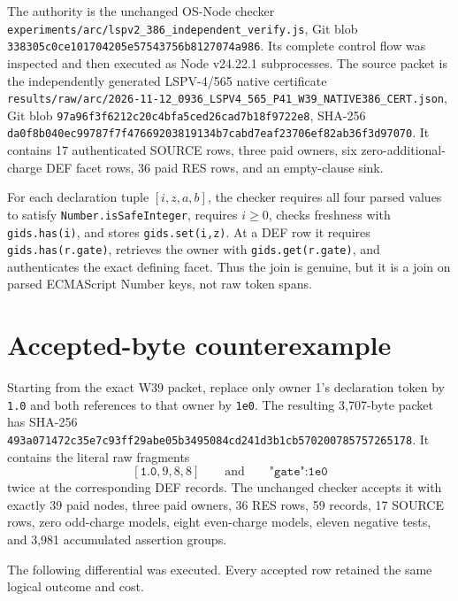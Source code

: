 \documentclass[11pt]{article}
\begin{document}
The authority is the unchanged OS-Node checker
\texttt{experiments/arc/lspv2\_386\_independent\_verify.js}, Git blob
\texttt{338305c0ce101704205e57543756b8127074a986}.  Its complete control flow was
inspected and then executed as Node v24.22.1 subprocesses.  The source packet is
the independently generated LSPV-4/565 native certificate
\texttt{results/raw/arc/2026-11-12\_0936\_LSPV4\_565\_P41\_W39\_NATIVE386\_CERT.json},
Git blob \texttt{97a96f3f6212c20c4bfa5ced26cad7b18f9722e8}, SHA-256
\texttt{da0f8b040ec99787f7f47669203819134b7cabd7eaf23706ef82ab36f3d97070}.
It contains 17 authenticated SOURCE rows, three paid owners, six zero-additional-
charge DEF facet rows, 36 paid RES rows, and an empty-clause sink.

For each declaration tuple $[i,z,a,b]$, the checker requires all four parsed
values to satisfy \texttt{Number.isSafeInteger}, requires $i\geq0$, checks
freshness with \texttt{gids.has(i)}, and stores \texttt{gids.set(i,z)}.  At a DEF
row it requires \texttt{gids.has(r.gate)}, retrieves the owner with
\texttt{gids.get(r.gate)}, and authenticates the exact defining facet.  Thus the
join is genuine, but it is a join on parsed ECMAScript Number keys, not raw token
spans.

\section{Accepted-byte counterexample}

Starting from the exact W39 packet, replace only owner 1's declaration token by
\texttt{1.0} and both references to that owner by \texttt{1e0}.  The resulting
3,707-byte packet has SHA-256
\texttt{493a071472c35e7c93ff29abe05b3495084cd241d3b1cb570200785757265178}.
It contains the literal raw fragments
\[
  [\texttt{1.0},9,8,8]
  \qquad\text{and}\qquad
  \texttt{"gate":1e0}
\]
twice at the corresponding DEF records.  The unchanged checker accepts it with
exactly 39 paid nodes, three paid owners, 36 RES rows, 59 records, 17 SOURCE rows,
zero odd-charge models, eight even-charge models, eleven negative tests, and
3,981 accumulated assertion groups.

The following differential was executed.  Every accepted row retained the same
logical outcome and cost.
\end{document}

